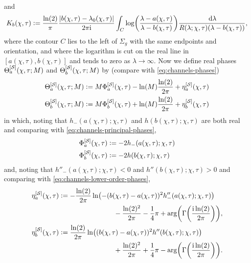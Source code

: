 and
\begin{equation}
K_b(\chi,\tau)\defeq \frac{\ln(2)}{\pi}\frac{|b(\chi,\tau)-\lambda_0(\chi,\tau)|}{2\pi\ii}
\int_{C}\log\left(\frac{\lambda-a(\chi,\tau)}{\lambda-b(\chi,\tau)}\right)\frac{\dd\lambda}{R(\lambda;\chi,\tau)(\lambda-b(\chi,\tau))},
\label{eq:intro-Kb}
\end{equation}
where the contour $C$ lies to the left of $\Sigma_g$ with the same endpoints and orientation, and where the logarithm is cut on the real line in $[a(\chi,\tau),b(\chi,\tau)]$ and tends to zero as $\lambda\to\infty$.  Now we define real phases $\Theta_a^{[\mathcal{S}]}(\chi,\tau;M)$ and $\Theta_b^{[\mathcal{S}]}(\chi,\tau;M)$ by (compare with \eqref{eq:channels-phases})
\begin{equation}
\begin{split}
\Theta_a^{[\shelves]}(\chi,\tau;M)&\defeq M\Phi_a^{[\shelves]}(\chi,\tau)-\ln(M)\frac{\ln(2)}{2\pi}+\eta_a^{[\shelves]}(\chi,\tau)
\\
\Theta_b^{[\shelves]}(\chi,\tau;M)&\defeq M\Phi_b^{[\shelves]}(\chi,\tau)+\ln(M)\frac{\ln(2)}{2\pi} +
\eta_b^{[\shelves]}(\chi,\tau) %
\end{split}
\label{eq:Thetas-shelves}
\end{equation}
in which, noting that $h_-(a(\chi,\tau);\chi,\tau)$ and $h(b(\chi,\tau);\chi,\tau)$ are both real and comparing with \eqref{eq:channels-principal-phases},
\begin{equation}
\begin{split}
\Phi_a^{[\mathcal{S}]}(\chi,\tau)&\vcentcolon= -2h_-(a(\chi,\tau);\chi,\tau)\\
\Phi_b^{[\mathcal{S}]}(\chi,\tau)&\vcentcolon= -2h(b(\chi,\tau);\chi,\tau)
\end{split}
\label{eq:Phis-shelves}
\end{equation}
and, noting that $h''_-(a(\chi,\tau);\chi,\tau)<0$ and $h''(b(\chi,\tau);\chi,\tau)>0$ and comparing with \eqref{eq:channels-lower-order-phases},
\begin{equation}
\begin{split}
\eta_a^{[\shelves]}(\chi,\tau)&\defeq -\frac{\ln(2)}{2\pi}\ln\left(-(b(\chi,\tau)-a(\chi,\tau))^2h''_-(a(\chi,\tau);\chi,\tau)\right)\\
&\qquad\qquad\qquad\qquad{}-\frac{\ln(2)^2}{2\pi}-\frac{1}{4}\pi+\arg\left(\Gamma\left(\frac{\ii\ln(2)}{2\pi}\right)\right),\\
\eta_b^{[\shelves]}(\chi,\tau)&\defeq \frac{\ln(2)}{2\pi}\ln\left((b(\chi,\tau)-a(\chi,\tau))^2h''(b(\chi,\tau);\chi,\tau)\right)\\
&\qquad\qquad\qquad\qquad{}+\frac{\ln(2)^2}{2\pi}+\frac{1}{4}\pi-\arg\left(\Gamma\left(\frac{\ii\ln(2)}{2\pi}\right)\right).
\end{split}
\end{equation}
